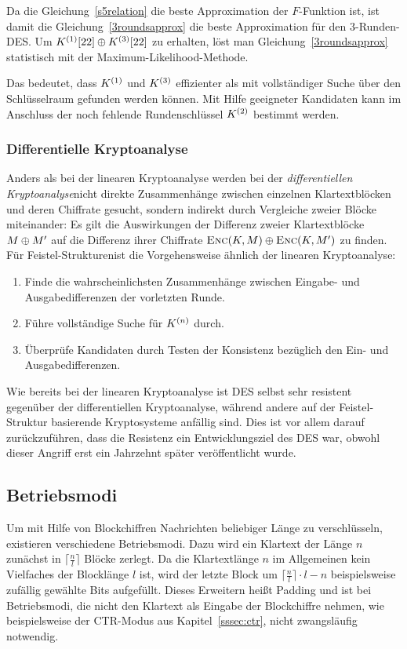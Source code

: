 Da die Gleichung~\ref{s5relation} die beste Approximation der
$F$-Funktion ist, ist damit die Gleichung~\ref{3roundsapprox} die beste
Approximation für den $3$-Runden-DES. Um $K^{(1)}[22] \oplus
K^{(3)}[22]$ zu erhalten, löst man Gleichung~\ref{3roundsapprox}
statistisch mit der Maximum-Likelihood-Methode.

Das bedeutet, dass $K^{(1)}$ und $K^{(3)}$ effizienter als mit
vollständiger Suche über den Schlüsselraum gefunden werden können. Mit
Hilfe geeigneter Kandidaten kann im Anschluss der noch fehlende
Rundenschlüssel $K^{(2)}$ bestimmt werden.

\subsubsection{Differentielle Kryptoanalyse}
\label{sssec:diffKryptoanalyse}
Anders als bei der linearen Kryptoanalyse werden bei der
\emph{differentiellen Kryptoanalyse}\indexDiffCrypt nicht direkte
Zusammenhänge zwischen einzelnen Klartextblöcken und deren Chiffrate
gesucht, sondern indirekt durch Vergleiche zweier Blöcke miteinander: Es
gilt die Auswirkungen der Differenz zweier Klartextblöcke $M
\oplus M'$ auf die Differenz ihrer Chiffrate $\textsc{Enc}(K, M)
\oplus \textsc{Enc}(K, M')$ zu finden. 
Für Feistel-Strukturen\indexFeistel ist die Vorgehensweise ähnlich der
linearen Kryptoanalyse: 
\begin{enumerate}
\item Finde die wahrscheinlichsten Zusammenhänge zwischen Eingabe- und
  Ausgabedifferenzen der vorletzten Runde. 
\item Führe vollständige Suche für $K^{(n)}$ durch.
\item Überprüfe Kandidaten durch Testen der Konsistenz bezüglich den
  Ein- und Ausgabedifferenzen. 
\end{enumerate}

Wie bereits bei der linearen Kryptoanalyse ist DES selbst sehr resistent
gegenüber der differentiellen Kryptoanalyse, während andere auf der
Feistel-Struktur basierende Kryptosysteme anfällig sind. Dies ist vor
allem darauf zurückzuführen, dass die Resistenz ein Entwicklungsziel des
DES war, obwohl dieser Angriff erst ein Jahrzehnt später veröffentlicht
wurde. 

\subsection{Betriebsmodi}
Um mit Hilfe von Blockchiffren Nachrichten beliebiger Länge zu
verschlüsseln, existieren verschiedene
Betriebsmodi. Dazu wird ein Klartext der Länge $n$
zunächst in $\lceil \frac{n}{l} \rceil$ Blöcke zerlegt. Da die
Klartextlänge $n$ im Allgemeinen kein Vielfaches der Blocklänge $l$ ist,
wird der letzte Block um $\lceil \frac{n}{l} \rceil \cdot l - n$
beispielsweise zufällig gewählte Bits aufgefüllt. Dieses Erweitern heißt
Padding und ist bei Betriebsmodi, die nicht den Klartext als Eingabe der
Blockchiffre nehmen, wie beispielsweise der CTR-Modus aus
Kapitel~\ref{sssec:ctr}, nicht zwangsläufig notwendig.

